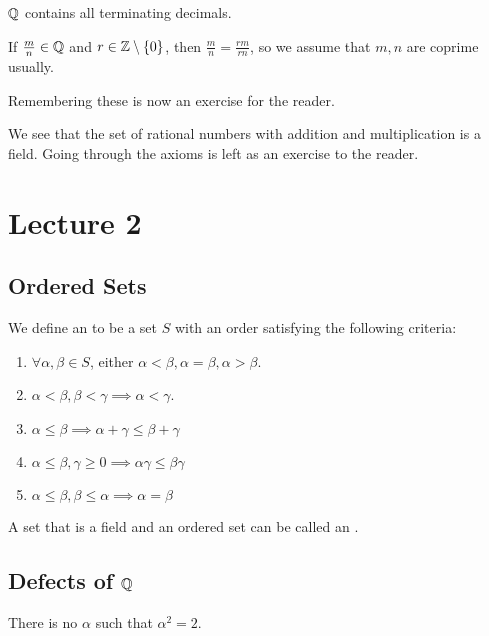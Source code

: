 \documentclass{book}
\begin{document}
\begin{remark}
    $\mathbb{Q}$ contains all terminating decimals.
\end{remark}

\begin{remark}
    If $\frac{m}{n} \in \mathbb{Q}$ and $r \in \mathbb{Z} \setminus \{0\}$, then $\frac{m}{n} = \frac{rm}{rn}$, so we assume that $m, n$ are coprime usually.
\end{remark}

\begin{definition}
    Remembering these is now an exercise for the reader.
\end{definition}

We see that the set of rational numbers with addition and multiplication is a field. Going through the axioms is left as an exercise to the reader.

\newpage
\section{Lecture 2}
\subsection{Ordered Sets}
\begin{defn}
    We define an  to be a set $S$ with an order satisfying the following criteria:
    \begin{enumerate}
        \item $\forall \alpha, \beta \in S$, either $\alpha < \beta, \alpha = \beta, \alpha > \beta$. 
        \item $\alpha < \beta, \beta < \gamma \implies \alpha < \gamma$.
        \item $\alpha \leq \beta \implies \alpha + \gamma \leq \beta + \gamma$
        \item $\alpha \leq \beta, \gamma \geq 0 \implies \alpha \gamma \leq \beta \gamma$
        \item $\alpha \leq \beta, \beta \leq \alpha \implies \alpha = \beta$
    \end{enumerate}
\end{defn}

A set that is a field and an ordered set can be called an .

\subsection{Defects of $\mathbb{Q}$}
\begin{thm}
    There is no $\alpha$ such that $\alpha^2 = 2$.
\end{thm}
\end{document}
